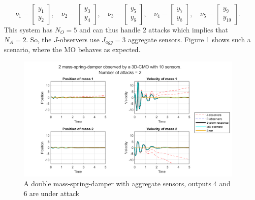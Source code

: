 \begin{example}
    \begin{equation*}
        \nu_1 = 
        \begin{bmatrix}
            y_1 \\ y_2
        \end{bmatrix}, \quad
        \nu_2 = 
        \begin{bmatrix}
            y_3 \\ y_4
        \end{bmatrix}, \quad
        \nu_3 = 
        \begin{bmatrix}
            y_5 \\ y_6
        \end{bmatrix}, \quad
        \nu_4 =
        \begin{bmatrix}
            y_7 \\ y_8
        \end{bmatrix}, \quad
        \nu_5 = 
        \begin{bmatrix}
            y_9 \\ y_{10}
        \end{bmatrix}.
    \end{equation*}
    This system has $N_O=5$ and can thus handle $2$ attacks which implies that $N_A=2$. So, the $J$-observers use $J_{agg}=3$ aggregate sensors. Figure \ref{fig:aggregate-functional} shows such a scenario, where the MO behaves as expected.

    \begin{figure}[H]
        \centering
        \includegraphics[width=\linewidth]{report/Figures/aggregate-nonlinear-10o2a.png}
        \caption{A double mass-spring-damper with aggregate sensors, outputs 4 and 6 are under attack}
        \label{fig:aggregate-functional}
    \end{figure}
    
\end{example}
